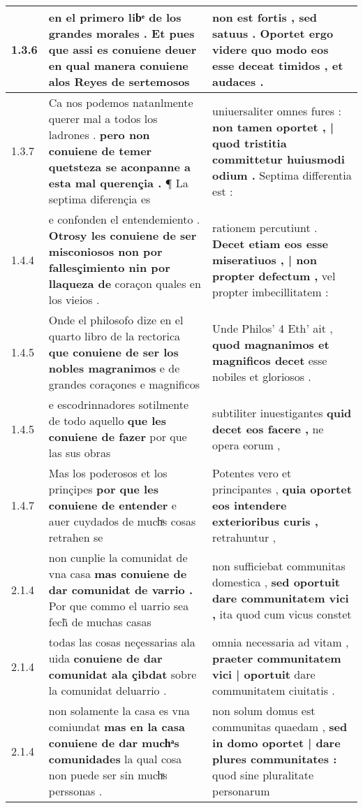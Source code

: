 \begin{tabular}{|p{1cm}|p{6.5cm}|p{6.5cm}|}
1.3.6 & en el primero libͤ de los grandes morales . \textbf{ Et pues que assi es conuiene deuer } en qual manera conuiene alos Reyes de sertemosos & non est fortis , sed satuus . \textbf{ Oportet ergo videre } quo modo eos esse deceat timidos , et audaces . \\\hline
1.3.7 & Ca nos podemos natanlmente querer mal a todos los ladrones . \textbf{ pero non conuiene de temer quetsteza se aconpanne a esta mal querençia . } ¶ La septima diferençia es & uniuersaliter omnes fures : \textbf{ non tamen oportet , | quod tristitia committetur huiusmodi odium . } Septima differentia est : \\\hline
1.4.4 & e confonden el entendemiento . \textbf{ Otrosy les conuiene de ser misconiosos non por fallesçimiento nin por llaqueza de } coraçon quales en los vieios . & rationem percutiunt . \textbf{ Decet etiam eos esse miseratiuos , | non propter defectum , } vel propter imbecillitatem : \\\hline
1.4.5 & Onde el philosofo dize en el quarto libro de la rectorica \textbf{ que conuiene de ser los nobles magranimos } e de grandes coraçones e magnificos & Unde Philos’ 4 Eth’ ait , \textbf{ quod magnanimos et magnificos decet } esse nobiles et gloriosos . \\\hline
1.4.5 & e escodrinnadores sotilmente de todo aquello \textbf{ que les conuiene de fazer } por que las sus obras & subtiliter inuestigantes \textbf{ quid decet eos facere , } ne opera eorum , \\\hline
1.4.7 & Mas los poderosos et los prinçipes \textbf{ por que les conuiene de entender } e auer cuydados de muchͣs cosas retrahen se & Potentes vero et principantes , \textbf{ quia oportet eos intendere exterioribus curis , } retrahuntur , \\\hline
2.1.4 & non cunplie la comunidat de vna casa \textbf{ mas conuiene de dar comunidat de varrio . } Por que commo el uarrio sea fech̃ de muchas casas & non sufficiebat communitas domestica , \textbf{ sed oportuit dare communitatem vici , } ita quod cum vicus constet \\\hline
2.1.4 & todas las cosas neçessarias ala uida \textbf{ conuiene de dar comunidat ala çibdat } sobre la comunidat deluarrio . & omnia necessaria ad vitam , \textbf{ praeter communitatem vici | oportuit } dare communitatem ciuitatis . \\\hline
2.1.4 & non solamente la casa es vna comiundat \textbf{ mas en la casa conuiene de dar muchͣs comunidades } la qual cosa non puede ser sin muchͣs perssonas . & non solum domus est communitas quaedam , \textbf{ sed in domo oportet | dare plures communitates : } quod sine pluralitate personarum \\\hline

\end{tabular}
